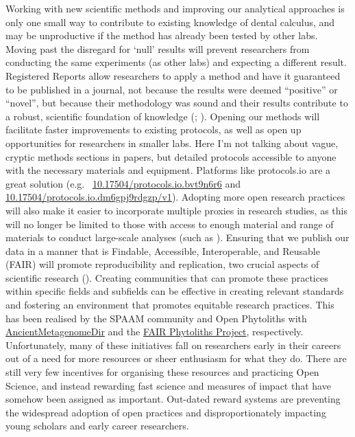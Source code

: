 \documentclass[
  b5paper,
]{book}
\begin{document}
Working with new scientific methods and improving our analytical
approaches is only one small way to contribute to existing knowledge of
dental calculus, and may be unproductive if the method has already been
tested by other labs. Moving past the disregard for `null' results will
prevent researchers from conducting the same experiments (as other labs)
and expecting a different result. Registered Reports allow researchers
to apply a method and have it guaranteed to be published in a journal,
not because the results were deemed ``positive'' or ``novel'', but
because their methodology was sound and their results contribute to a
robust, scientific foundation of knowledge
(;
).
Opening our methods will facilitate faster improvements to existing
protocols, as well as open up opportunities for researchers in smaller
labs. Here I'm not talking about vague, cryptic methods sections in
papers, but detailed protocols accessible to anyone with the necessary
materials and equipment. Platforms like protocols.io are a great
solution (e.g.~
\href{dx.doi.org/10.17504/protocols.io.bvt9n6r6}{10.17504/protocols.io.bvt9n6r6}
and
\href{dx.doi.org/10.17504/protocols.io.dm6gpj9rdgzp/v1}{10.17504/protocols.io.dm6gpj9rdgzp/v1}).
Adopting more open research practices will also make it easier to
incorporate multiple proxies in research studies, as this will no longer
be limited to those with access to enough material and range of
materials to conduct large-scale analyses (such as
).
Ensuring that we publish our data in a manner that is Findable,
Accessible, Interoperable, and Reusable (FAIR) will promote
reproducibility and replication, two crucial aspects of scientific
research (). Creating communities that can promote these practices within
specific fields and subfields can be effective in creating relevant
standards and fostering an environment that promotes equitable research
practices. This has been realised by the SPAAM community and Open
Phytoliths with
\href{https://zenodo.org/record/7789069}{AncientMetagenomeDir} and the
\href{https://zenodo.org/record/6435441}{FAIR Phytoliths Project},
respectively. Unfortunately, many of these initiatives fall on
researchers early in their careers out of a need for more resources or
sheer enthusiasm for what they do. There are still very few incentives
for organising these resources and practicing Open Science, and instead
rewarding fast science and measures of impact that have somehow been
assigned as important. Out-dated reward systems are preventing the
widespread adoption of open practices and disproportionately impacting
young scholars and early career researchers.
\end{document}
